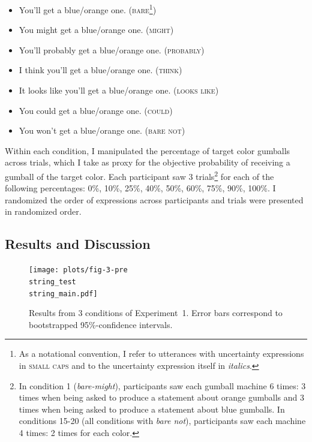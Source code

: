  \begin{itemize}
\item You'll get a blue/orange one. (\textsc{bare}\footnote{As a notational convention, I refer to utterances with uncertainty expressions in \textsc{small caps} and to the uncertainty expression itself in \textit{italics}. })
\item You might get a blue/orange one. (\textsc{might})
\item You'll probably get a blue/orange one. (\textsc{probably})
\item I think you'll get a blue/orange one. (\textsc{think})
\item It looks like you'll get a blue/orange one. (\textsc{looks like})
\item You could get a blue/orange one. (\textsc{could})
\item You won't get a blue/orange one. (\textsc{bare not})
\end{itemize}


\noindent Within each condition, I manipulated the percentage of target color gumballs across trials, which I take as proxy for the objective probability of receiving a gumball of the target color. 
Each participant saw 3 trials\footnote{In condition 1 (\textit{bare-might}), participants saw each gumball machine 6 times: 3 times when being asked to produce a statement about orange gumballs and 3 times when being asked to produce a statement about blue gumballs. In conditions 15-20 (all conditions with \textit{bare not}), participants saw each machine 4 times: 2 times for each color.} 
for each of the following percentages: 0\%, 10\%, 25\%, 40\%, 50\%, 60\%, 75\%, 90\%, 100\%. I randomized the order of expressions across participants and trials were presented in randomized order.

\subsection{Results and Discussion}

\begin{figure}
\texttt{[image: plots/fig-3-pre\\string\_test\\string\_main.pdf]} 
\caption{Results from 3 conditions of Experiment~1. Error bars correspond to bootstrapped 95\%-confidence intervals. \label{fig:norming-results-main} }
\end{figure}

